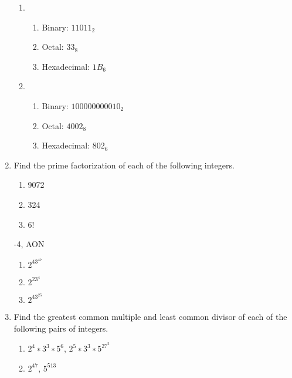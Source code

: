 \begin{enumerate}
\vspace{2mm}
\begin{solution}
\begin{enumerate}
    \item \begin{enumerate}
        \item Binary: $11011_2$
        \item Octal: $33_8$
        \item Hexadecimal: $1B_6$
    \end{enumerate}
    \item \begin{enumerate}
        \item Binary: $100000000010_2$
        \item Octal: $4002_8$
        \item Hexadecimal: $802_6$
    \end{enumerate}
\end{enumerate}
\end{solution}

\item Find the prime factorization of each of the following integers. 
\begin{enumerate}
    \item 9072
    \item 324
    \item 6!
\end{enumerate}

\begin{rubric}
    -4, AON
\end{rubric}

\begin{solution}
\begin{enumerate}
    \item $2^43^47$
    \item $2^23^4$
    \item $2^43^25$
\end{enumerate}
\end{solution}

\item Find the greatest common multiple and least common divisor of each of the following pairs of integers. 
\begin{enumerate}
    \item $2^4 ∗3^3 ∗5^6$, $2^5 ∗3^3 ∗5^27^2$
    \item $2^47$, $5^513$
\end{enumerate}


\end{enumerate}
